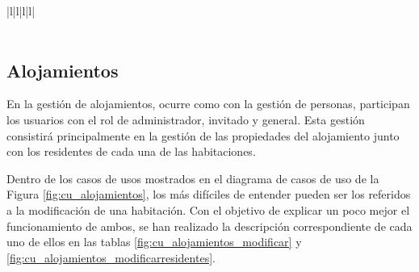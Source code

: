 \begin{table}[hp!]
{\begin{tabular}{|l|l|l|l|}
        \hline
                                                                                                                                                                                                                            \\ 
        \hline
            \\
        \hline
        \end{tabular}
    }
    \caption{Curso de eventos del caso de uso 3}
\end{table}

\newpage

\subsection{Alojamientos}

En la gestión de alojamientos, ocurre como con la gestión de personas, participan los usuarios con el rol de administrador, invitado y general. Esta gestión consistirá principalmente en la gestión de las propiedades del alojamiento junto con los residentes de cada una de las habitaciones. 

Dentro de los casos de usos mostrados en el diagrama de casos de uso de la Figura \ref{fig:cu_alojamientos}, los más difíciles de entender pueden ser los referidos a la modificación de una habitación. Con el objetivo de explicar un poco mejor el funcionamiento de ambos, se han realizado la descripción correspondiente de cada uno de ellos en las tablas \ref{fig:cu_alojamientos_modificar} y \ref{fig:cu_alojamientos_modificarresidentes}. 

